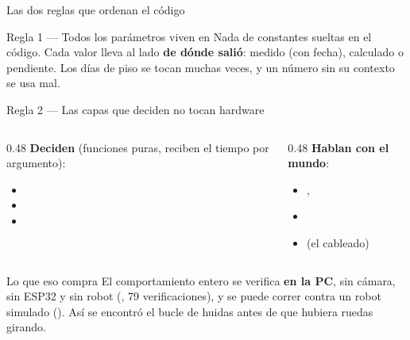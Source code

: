\begin{frame}{Las dos reglas que ordenan el código}
  \begin{block}{Regla 1 --- Todos los parámetros viven en }
    Nada de constantes sueltas en el código. Cada valor lleva al lado
    \textbf{de dónde salió}: medido (con fecha), calculado o pendiente. Los
    días de piso se tocan muchas veces, y un número sin su contexto se usa mal.
  \end{block}

  \begin{block}{Regla 2 --- Las capas que deciden no tocan hardware}
    \begin{columns}[T,onlytextwidth]
      \begin{column}{0.48\textwidth}
        \textbf{Deciden} (funciones puras, reciben el tiempo por argumento):
        \begin{itemize}
          \item {}
          \item {}
          \item {}
        \end{itemize}
      \end{column}
      \begin{column}{0.48\textwidth}
        \textbf{Hablan con el mundo}:
        \begin{itemize}
          \item {}, 
          \item {}
          \item {} (el cableado)
        \end{itemize}
      \end{column}
    \end{columns}
  \end{block}

  \begin{exampleblock}{Lo que eso compra}
    {\small El comportamiento entero se verifica \textbf{en la PC}, sin cámara, sin
    ESP32 y sin robot (, 79 verificaciones), y se puede
    correr contra un robot simulado (). Así se encontró
    el bucle de huidas antes de que hubiera ruedas girando.}
  \end{exampleblock}
\end{frame}

